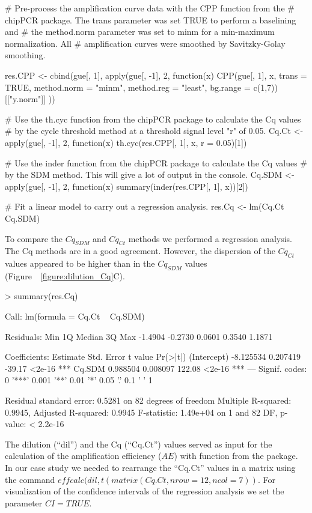\begin{example}
# Pre-process the amplification curve data with the CPP function from the 
# chipPCR package. The trans parameter was set TRUE to perform a baselining and 
# the method.norm parameter was set to minm for a min-maximum normalization. All
# amplification curves were smoothed by Savitzky-Golay smoothing.

res.CPP <- cbind(gue[, 1], apply(gue[, -1], 2, function(x) {
  CPP(gue[, 1], x, trans = TRUE, method.norm = "minm", method.reg = "least", 
      bg.range = c(1,7))[["y.norm"]]
}))

# Use the th.cyc function from the chipPCR package to calculate the Cq values
# by the cycle threshold method at a threshold signal level "r" of 0.05.
Cq.Ct <- apply(gue[, -1], 2, function(x) 
  th.cyc(res.CPP[, 1], x, r = 0.05)[1])

# Use the inder function from the chipPCR package to calculate the Cq values
# by the SDM method. This will give a lot of output in the console.
Cq.SDM <- apply(gue[, -1], 2, function(x)
  summary(inder(res.CPP[, 1], x))[2])

# Fit a linear model to carry out a regression analysis.
res.Cq <- lm(Cq.Ct ~ Cq.SDM)
\end{example}

To compare the $Cq_{SDM}$ and $Cq_{Ct}$ methods we performed a regression 
analysis. The Cq methods are in a good agreement. However, the dispersion of the 
$Cq_{Ct}$ values appeared to be higher than in the $Cq_{SDM}$ values 
(Figure~~\ref{figure:dilution_Cq}C).

\begin{example}
> summary(res.Cq)

Call:
lm(formula = Cq.Ct ~ Cq.SDM)

Residuals:
    Min      1Q  Median      3Q     Max 
-1.4904 -0.2730  0.0601  0.3540  1.1871 

Coefficients:
             Estimate Std. Error t value Pr(>|t|)    
(Intercept) -8.125534   0.207419  -39.17   <2e-16 ***
Cq.SDM       0.988504   0.008097  122.08   <2e-16 ***
---
Signif. codes:  0 '***' 0.001 '**' 0.01 '*' 0.05 '.' 0.1 ' ' 1

Residual standard error: 0.5281 on 82 degrees of freedom
Multiple R-squared:  0.9945,  Adjusted R-squared:  0.9945 
F-statistic: 1.49e+04 on 1 and 82 DF,  p-value: < 2.2e-16
\end{example}

The dilution (``dil'') and the Cq (``Cq.Ct'') values served as input for the 
calculation of the amplification efficiency ($AE$) with  function 
from the  package. In our case study we needed to rearrange the 
``Cq.Ct'' values in a matrix using the command $effcalc(dil, t(matrix(Cq.Ct, 
nrow = 12, ncol = 7))$. For visualization of the confidence intervals of the 
regression analysis we set the parameter $CI = TRUE$.


